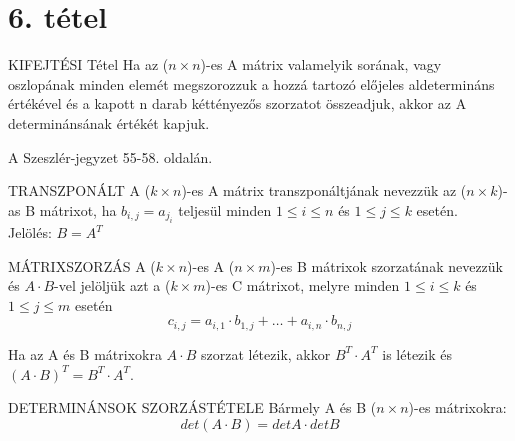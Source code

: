\section{6. tétel}

\begin{tetel}{KIFEJTÉSI Tétel}
Ha az ($n \times n$)-es A mátrix valamelyik sorának, vagy oszlopának minden elemét megszorozzuk a hozzá tartozó előjeles aldetermináns értékével és a kapott n darab kéttényezős szorzatot összeadjuk, akkor az A determinánsának értékét kapjuk.
\end{tetel}

\begin{bizonyitas}{}
A Szeszlér-jegyzet 55-58. oldalán.
\end{bizonyitas}



\begin{definicio}{TRANSZPONÁLT}
A ($k\times n$)-es A mátrix transzponáltjának nevezzük az ($n\times k$)-as B mátrixot, ha $b_{i,j} = a_{j_i}$ teljesül minden $1 \leq i \leq n$ és $1 \leq j \leq k$ esetén.\\
Jelölés: $B = A^T$
\end{definicio}

\begin{definicio}{MÁTRIXSZORZÁS}
A ($k\times n$)-es A ($n\times m$)-es B mátrixok szorzatának nevezzük és $A\cdot B$-vel jelöljük azt a ($k\times m$)-es C mátrixot, melyre minden $1 \leq i \leq k$ és $1 \leq j \leq m$ esetén
$$c_{i,j} = a_{i,1}\cdot b_{1, j}+\ldots+a_{i,n}\cdot b_{n,j}$$
\end{definicio}

Ha az A és B mátrixokra $A \cdot B$ szorzat létezik, akkor $B^T \cdot A^T$ is létezik és $(A\cdot B)^T = B^T \cdot A^T$.

\begin{tetel}{DETERMINÁNSOK SZORZÁSTÉTELE}
Bármely A és B ($n\times n$)-es mátrixokra: $$det(A\cdot B)=detA \cdot detB$$
\end{tetel}

